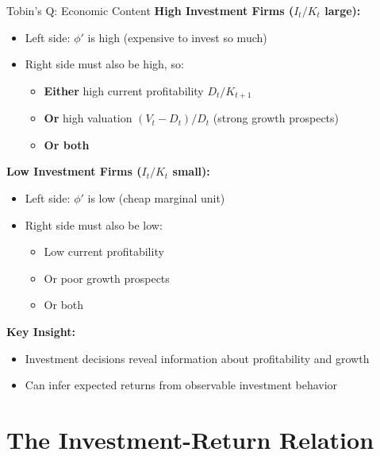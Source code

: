 \documentclass{beamer}
\begin{document}
\begin{frame}{Tobin's Q: Economic Content}
    \textbf{High Investment Firms ($I_t/K_t$ large):}
    \begin{itemize}
        \item Left side: $\phi'$ is high (expensive to invest so much)
        \item Right side must also be high, so:
        \begin{itemize}
            \item \textbf{Either} high current profitability $D_t/K_{t+1}$
            \item \textbf{Or} high valuation $(V_t - D_t)/D_t$ (strong growth prospects)
            \item \textbf{Or both}
        \end{itemize}
    \end{itemize}
    
    
    \textbf{Low Investment Firms ($I_t/K_t$ small):}
    \begin{itemize}
        \item Left side: $\phi'$ is low (cheap marginal unit)
        \item Right side must also be low:
        \begin{itemize}
            \item Low current profitability
            \item Or poor growth prospects
            \item Or both
        \end{itemize}
    \end{itemize}
    
    
    \textbf{Key Insight:}
    \begin{itemize}
        \item Investment decisions reveal information about profitability and growth
        \item Can infer expected returns from observable investment behavior
    \end{itemize}
\end{frame}

\section{The Investment-Return Relation}
\end{document}
